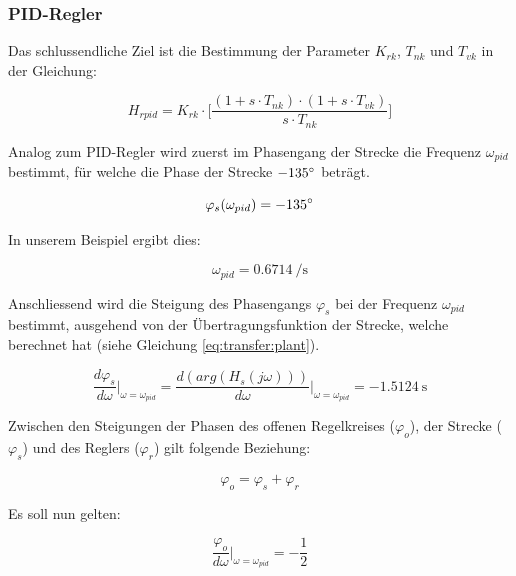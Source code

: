 \subsubsection*{PID-Regler}

Das schlussendliche Ziel ist die Bestimmung der Parameter $K_{rk}$, $T_{nk}$ und $T_{vk}$
in der Gleichung:

\begin{equation} \label{eq:pid:target}
    H_{rpid} = K_{rk} \cdot \biggl[ \frac{(1 + s \cdot T_{nk}) \cdot (1 + s \cdot T_{vk}) }{ s \cdot T_{nk} } \biggr]
\end{equation}

Analog  zum PID-Regler  wird zuerst  im  Phasengang der  Strecke die  Frequenz
$\omega_{pid}$  bestimmt, f\"ur  welche  die Phase  der Strecke  $-135\degree$
betr\"agt.

\begin{equation} \label{eq:pid:phi_s}
    \varphi_s(\omega_{pid}) = -135 \degree
\end{equation}

In unserem Beispiel ergibt dies:

\begin{equation} \label{eq:pid:omega_pid}
    \omega_{pid} = \SI{0.6714}{\per\second}
\end{equation}

Anschliessend wird die  Steigung des Phasengangs $\varphi_s$  bei der Frequenz
$\omega_{pid}$ bestimmt, ausgehend von der \"Ubertragungsfunktion der Strecke,
welche  berechnet hat (siehe Gleichung \ref{eq:transfer:plant}).

\begin{equation} \label{eq:transfer:plant:derivative}
    \frac{d\varphi_s}{d\omega} \biggr \rvert_{\omega=\omega_{pid}}
        = \frac{d(arg(H_s(j\omega)))}{d\omega} \biggr \rvert_{\omega=\omega_{pid}}
        = \SI{-1.5124}{\second}
\end{equation}

Zwischen den Steigungen der Phasen des offenen Regelkreises ($\varphi_o$), der
Strecke ($\varphi_s$) und des Reglers ($\varphi_r$) gilt folgende Beziehung:

\begin{equation} \label{eq:pid:phi_sum}
    \varphi_o = \varphi_s + \varphi_r
\end{equation}

Es soll nun gelten:

\begin{equation} \label{eq:pid:dphi_o_target}
    \frac{\varphi_o}{d\omega} \biggr \rvert_{\omega=\omega_{pid}} = - \frac{1}{2}
\end{equation}

